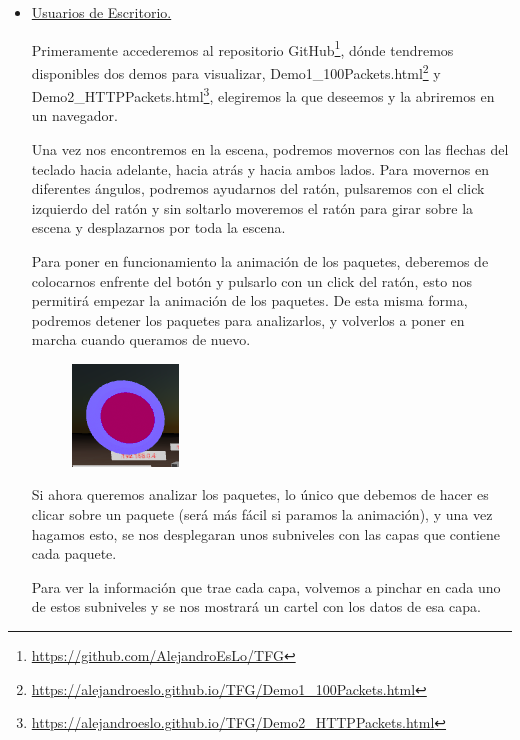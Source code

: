 \documentclass[a4paper, 12pt]{book}
\begin{document}
\begin{itemize}

    \item \underline{Usuarios de Escritorio.} 
    
Primeramente accederemos al repositorio GitHub\footnote{\url{https://github.com/AlejandroEsLo/TFG}}, dónde tendremos disponibles dos demos para visualizar, Demo1\_100Packets.html\footnote{\url{https://alejandroeslo.github.io/TFG/Demo1_100Packets.html}} y  Demo2\_HTTPPackets.html\footnote{\url{https://alejandroeslo.github.io/TFG/Demo2_HTTPPackets.html}}, elegiremos la que deseemos y la abriremos en un navegador.

Una vez nos encontremos en la escena, podremos movernos con las flechas del teclado hacia adelante, hacia atrás y hacia ambos lados. Para movernos en diferentes ángulos, podremos ayudarnos del ratón, pulsaremos con el click izquierdo del ratón y sin soltarlo moveremos el ratón para girar sobre la escena y desplazarnos por toda la escena.

Para poner en funcionamiento la animación de los paquetes, deberemos de colocarnos enfrente del botón y pulsarlo con un click del ratón, esto nos permitirá empezar la animación de los paquetes. De esta misma forma, podremos detener los paquetes para analizarlos, y volverlos a poner en marcha cuando queramos de nuevo.
\begin{figure}[h]
\centering
    \includegraphics[scale=0.5]{img/boton_im.png}
\end{figure}

Si ahora queremos analizar los paquetes, lo único que debemos de hacer es clicar sobre un paquete (será más fácil si paramos la animación), y una vez hagamos esto, se nos desplegaran unos subniveles con las capas que contiene cada paquete.

Para ver la información que trae cada capa, volvemos a pinchar en cada uno de estos subniveles y se nos mostrará un cartel con los datos de esa capa.


\end{itemize}
\end{document}
